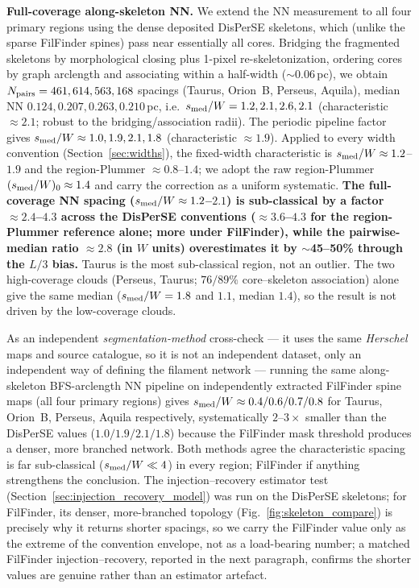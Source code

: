 \documentclass[usenatbib,twoside,twocolumn]{mnras}
\begin{document}
\textbf{Full-coverage along-skeleton NN.} We extend the NN measurement to all four primary regions using the dense deposited DisPerSE skeletons, which (unlike the sparse FilFinder spines) pass near essentially all cores. Bridging the fragmented skeletons by morphological closing plus 1-pixel re-skeletonization, ordering cores by graph arclength and associating within a half-width ($\sim$0.06\,pc), we obtain $N_{\rm pairs}=461,614,563,168$ spacings (Taurus, Orion~B, Perseus, Aquila), median NN $0.124,0.207,0.263,0.210$\,pc, i.e.\ $s_{\rm med}/W=1.2,2.1,2.6,2.1$ (characteristic $\approx2.1$; robust to the bridging/association radii). The periodic pipeline factor gives $s_{\rm med}/W\approx1.0,1.9,2.1,1.8$ (characteristic $\approx1.9$). Applied to every width convention (Section~\ref{sec:widths}), the fixed-width characteristic is $s_{\rm med}/W\approx1.2$--$1.9$ and the region-Plummer $\approx0.8$--$1.4$; we adopt the raw region-Plummer $(s_{\rm med}/W)_0\approx1.4$ and carry the correction as a uniform systematic. \textbf{The full-coverage NN spacing ($s_{\rm med}/W\approx1.2$--$2.1$) is sub-classical by a factor $\approx2.4$--$4.3$ across the DisPerSE conventions ($\approx3.6$--$4.3$ for the region-Plummer reference alone; more under FilFinder), while the pairwise-median ratio $\approx2.8$ (in $W$ units) overestimates it by $\sim$45--50\% through the $L/3$ bias.} Taurus is the most sub-classical region, not an outlier. The two high-coverage clouds (Perseus, Taurus; $76/89\%$ core--skeleton association) alone give the same median ($s_{\rm med}/W=1.8$ and $1.1$, median $1.4$), so the result is not driven by the low-coverage clouds.

As an independent \emph{segmentation-method} cross-check --- it uses the same \textit{Herschel} maps and source catalogue, so it is not an independent dataset, only an independent way of defining the filament network --- running the same along-skeleton BFS-arclength NN pipeline on independently extracted FilFinder spine maps (all four primary regions) gives $s_{\rm med}/W\approx0.4/0.6/0.7/0.8$ for Taurus, Orion~B, Perseus, Aquila respectively, systematically $2$--$3\times$ smaller than the DisPerSE values ($1.0/1.9/2.1/1.8$) because the FilFinder mask threshold produces a denser, more branched network. Both methods agree the characteristic spacing is far sub-classical ($s_{\rm med}/W\ll4$) in every region; FilFinder if anything strengthens the conclusion. The injection--recovery estimator test (Section~\ref{sec:injection_recovery_model}) was run on the DisPerSE skeletons; for FilFinder, its denser, more-branched topology (Fig.~\ref{fig:skeleton_compare}) is precisely why it returns shorter spacings, so we carry the FilFinder value only as the extreme of the convention envelope, not as a load-bearing number; a matched FilFinder injection--recovery, reported in the next paragraph, confirms the shorter values are genuine rather than an estimator artefact.
\end{document}
